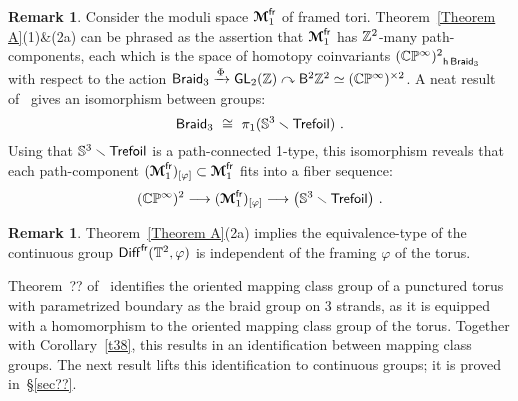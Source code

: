 \documentclass{amsart}
\theoremstyle{definition}
\newtheorem{remark}[theorem]{Remark}
\newtheorem{notation}[theorem]{Notation}
\theoremstyle{remark}
\newcommand{\lacts}{\curvearrowright}
\DeclareMathOperator{\Diff}{{\sf Diff}}
\DeclareMathOperator{\fr}{\sf fr}
\newcommand{\xra}{\xrightarrow}
\def\bcM{\boldsymbol{\mathcal M}}\def\bcN{\boldsymbol{\mathcal N}}\def\bcO{\boldsymbol{\mathcal O}}\def\bcP{\boldsymbol{\mathcal P}}\def\bcQ{\boldsymbol{\mathcal Q}}\def\bcR{\boldsymbol{\mathcal R}}
\def\bcM{\boldsymbol{\mathcal M}}
\DeclareMathOperator{\Braid}{{\sf Braid}_3}
\DeclareMathOperator{\GL}{\sf GL}
\begin{document}
\begin{remark}
Consider the moduli space $\bcM^{\fr}_1$ of framed tori.  
Theorem~\ref{Theorem A}(1)\&(2a) can be phrased as the assertion that $\bcM^{\fr}_1$ has $\mathbb Z^2$-many path-components, each which is the space of homotopy coinvariants ${(\CC\PP^\infty)^2}_{{\sf h} \Braid}$ with respect to the action $\Braid \xra{\Phi} \GL_2(\ZZ) \lacts \sB^2 \ZZ^2 \simeq (\CC\PP^\infty)^{\times 2}$.
A neat result of~{\color{red}\cite{??}} gives an isomorphism between groups: 
\[
\Braid
~\cong~ 
\pi_1 (\SS^3 \smallsetminus {\sf Trefoil} )
~.
\]
Using that $\mathbb S^3 \smallsetminus {\sf Trefoil}$ is a path-connected 1-type, this isomorphism reveals that each path-component $(\bcM^{\fr}_1)_{[\varphi]} \subset \bcM^{\fr}_1$ fits into a fiber sequence:
\[
(\CC\PP^\infty)^2
\longrightarrow
(\bcM^{\fr}_1)_{[\varphi]}
\longrightarrow
\bigl( \SS^3 \smallsetminus {\sf Trefoil} \bigr)
~.
\]


\end{remark}





\begin{remark}
Theorem~\ref{Theorem A}(2a) implies the equivalence-type of the continuous group $\Diff^{\fr}(\TT^2,\varphi)$ is independent of the framing $\varphi$ of the torus.  

\end{remark}


%
%


Theorem~?? of~\cite{??} identifies the oriented mapping class group of a punctured torus with parametrized boundary as the braid group on 3 strands, as it is equipped with a homomorphism to the oriented mapping class group of the torus.  
Together with Corollary~\ref{t38}, this results in an identification between mapping class groups.  
The next result lifts this identification to continuous groups; it is proved in~\S\ref{sec??}.  
\end{document}
